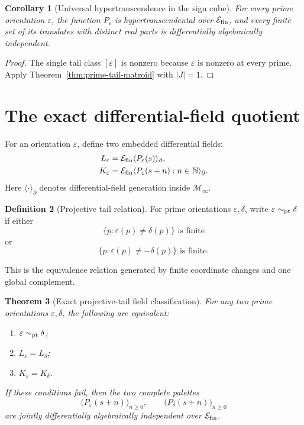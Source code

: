\documentclass[11pt]{article}
\newtheorem{theorem}{Theorem}[section]
\newtheorem{corollary}[theorem]{Corollary}
\theoremstyle{definition}
\newtheorem{definition}[theorem]{Definition}
\theoremstyle{remark}
\newcommand{\N}{\mathbb N}
\newcommand{\cE}{\mathcal E}
\newcommand{\Diff}{\partial}
\begin{document}
\begin{corollary}[Universal hypertranscendence in the sign cube]\label{cor:all-ht}
For every prime orientation \(\varepsilon\), the function \(P_\varepsilon\) is
hypertranscendental over \(\cE_{\rm fin}\), and every finite set of its translates with distinct
real parts is differentially algebraically independent.
\end{corollary}

\begin{proof}
The single tail class \([\varepsilon]\) is nonzero because \(\varepsilon\) is nonzero at every
prime.  Apply Theorem~\ref{thm:prime-tail-matroid} with \(|J|=1\).
\end{proof}

\section{The exact differential-field quotient}\label{sec:field-moduli}

For an orientation \(\varepsilon\), define two embedded differential fields:
\begin{align*}
  L_\varepsilon
  &=\cE_{\rm fin}\langle P_\varepsilon(s)\rangle_\Diff,\\
  K_\varepsilon
  &=\cE_{\rm fin}\langle P_\varepsilon(s+n):n\in\N\rangle_\Diff.
\end{align*}
Here \(\langle\cdot\rangle_\Diff\) denotes differential-field generation inside
\(\mathscr M_\infty\).

\begin{definition}[Projective tail relation]\label{def:projective-tail}
For prime orientations \(\varepsilon,\delta\), write
\(\varepsilon\sim_{\rm pt}\delta\) if either
\[
  \{p:\varepsilon(p)\neq\delta(p)\}\text{ is finite}
\]
or
\[
  \{p:\varepsilon(p)\neq-\delta(p)\}\text{ is finite}.
\]
\end{definition}

This is the equivalence relation generated by finite coordinate changes and one global
complement.

\begin{theorem}[Exact projective-tail field classification]
\label{thm:field-classification}
For any two prime orientations \(\varepsilon,\delta\), the following are equivalent:
\begin{enumerate}[label=\textup{(\roman*)},leftmargin=2.2em]
  \item \(\varepsilon\sim_{\rm pt}\delta\);
  \item \(L_\varepsilon=L_\delta\);
  \item \(K_\varepsilon=K_\delta\).
\end{enumerate}
If these conditions fail, then the two complete palettes
\[
  \bigl(P_\varepsilon(s+n)\bigr)_{n\geq0},
  \qquad
  \bigl(P_\delta(s+n)\bigr)_{n\geq0}
\]
are jointly differentially algebraically independent over \(\cE_{\rm fin}\).
\end{theorem}
\end{document}
